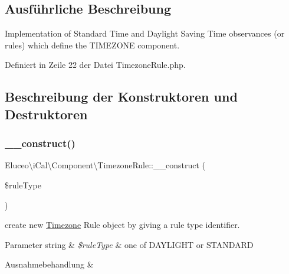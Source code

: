 \subsection{Ausführliche Beschreibung}
Implementation of Standard Time and Daylight Saving Time observances (or rules) which define the T\+I\+M\+E\+Z\+O\+NE component. 

Definiert in Zeile 22 der Datei Timezone\+Rule.\+php.



\subsection{Beschreibung der Konstruktoren und Destruktoren}
\mbox{\label{class_eluceo_1_1i_cal_1_1_component_1_1_timezone_rule_af9ae541025f04809b70e8b2a31e0fa61}} 
\subsubsection{\texorpdfstring{\+\_\+\+\_\+construct()}{\_\_construct()}\hspace{0.1cm}{\footnotesize\ttfamily [1/3]}}
{\footnotesize\ttfamily Eluceo\textbackslash{}i\+Cal\textbackslash{}\+Component\textbackslash{}\+Timezone\+Rule\+::\+\_\+\+\_\+construct (\begin{DoxyParamCaption}\item[{}]{\$rule\+Type }\end{DoxyParamCaption})}

create new \mbox{\hyperlink{class_eluceo_1_1i_cal_1_1_component_1_1_timezone}{Timezone}} Rule object by giving a rule type identifier.


\begin{DoxyParams}[1]{Parameter}
string & {\em \$rule\+Type} & one of D\+A\+Y\+L\+I\+G\+HT or S\+T\+A\+N\+D\+A\+RD\\
\hline
\end{DoxyParams}

\begin{DoxyExceptions}{Ausnahmebehandlung}
{\em } & \\
\hline
\end{DoxyExceptions}


